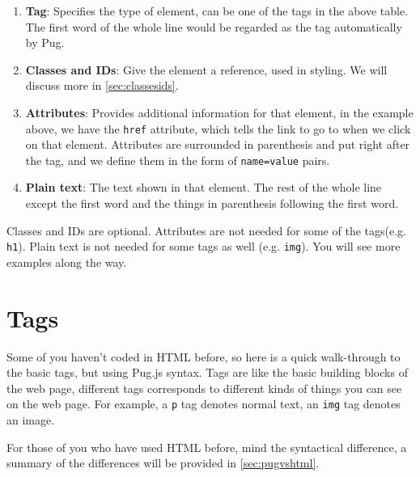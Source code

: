 \begin{enumerate}
    \item \textbf{Tag}: Specifies the type of element, can be one of the tags in the above table. The first word of the whole line would be regarded as the tag automatically by Pug.
    \item \textbf{Classes and IDs}: Give the element a reference, used in styling. We will discuss more in \cref{sec:classesids}.
    \item \textbf{Attributes}: Provides additional information for that element, in the example above, we have the \texttt{href} attribute, which tells the link to go to when we click on that element. Attributes are surrounded in parenthesis and put right after the tag, and we define them in the form of \texttt{name=value} pairs.
    \item \textbf{Plain text}: The text shown in that element. The rest of the whole line except the first word and the things in parenthesis following the first word.
\end{enumerate}

Classes and IDs are optional. Attributes are not needed for some of the tags(e.g. \texttt{h1}). Plain text is not needed for some tags as well (e.g. \texttt{img}). You will see more examples along the way.

\section{Tags}

Some of you haven't coded in HTML before, so here is a quick walk-through to the basic tags, but using Pug.js syntax. Tags are like the basic building blocks of the web page, different tags corresponds to different kinds of things you can see on the web page. For example, a \texttt{p} tag denotes normal text, an \texttt{img} tag denotes an image. 
\vspace{6mm}

For those of you who have used HTML before, mind the syntactical difference, a summary of the differences will be provided in \cref{sec:pugvshtml}. 

\pagebreak

